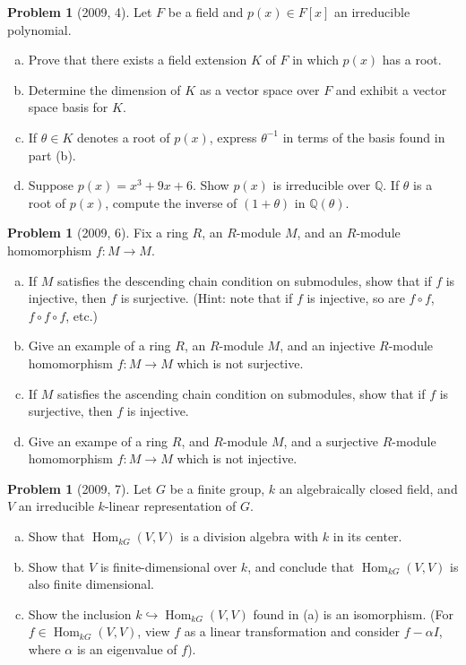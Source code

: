 \documentclass{article}
\newcommand{\inv}{^{-1}}
\newcommand{\<}{\langle} %
\renewcommand{\>}{\rangle} %
\DeclareMathOperator{\Hom}{Hom}
\theoremstyle{plain}
\theoremstyle{remark}
\theoremstyle{definition}
\newtheorem{examproblem}[equation]{Problem}
\begin{document}
\begin{examproblem}[2009, 4]
	Let $F$ be a field and $p(x)\in F[x]$ an irreducible polynomial.
	\begin{enumerate}[(a)]
		\item Prove that there exists a field extension $K$ of $F$
			in which $p(x)$ has a root.
		\item Determine the dimension of $K$ as a vector space over $F$
			and exhibit a vector space basis for $K$.
		\item If $\theta\in K$ denotes a root of $p(x)$, express
			$\theta\inv$ in terms of the basis found in part (b).
		\item Suppose $p(x)=x^3+9x+6$. Show $p(x)$ is irreducible over
			$\mathbb Q$. If $\theta$ is a root of $p(x)$, compute
			the inverse of $(1+\theta)$ in $\mathbb Q(\theta)$.
  \end{enumerate}
\end{examproblem}

\begin{examproblem}[2009, 6]
	Fix a ring $R$, an $R$-module $M$, and an $R$-module homomorphism
	$f:M\rightarrow M$.
	\begin{enumerate}[(a)]
		\item If $M$ satisfies the descending chain condition on submodules,
			show that if $f$ is injective, then $f$ is surjective.
			(Hint: note that if $f$ is injective, so are
			$f\circ f$, $f\circ f\circ f$, etc.)
		\item Give an example of a ring $R$, an $R$-module $M$,
			and an injective $R$-module homomorphism $f:M\rightarrow M$
			which is not surjective.
		\item If $M$ satisfies the ascending chain condition on submodules,
			show that if $f$ is surjective, then $f$ is injective.
		\item Give an exampe of a ring $R$, and $R$-module $M$, and
			a surjective $R$-module homomorphism $f:M\rightarrow M$
			which is not injective.
	\end{enumerate}
\end{examproblem}

\begin{examproblem}[2009, 7]
	Let $G$ be a finite group, $k$ an algebraically closed field, and $V$
	an irreducible $k$-linear representation of $G$.
	\begin{enumerate}[(a)]
		\item Show that $\Hom_{kG}(V,V)$ is a division algebra with $k$
			in its center.
		\item Show that $V$ is finite-dimensional over $k$, and conclude
			that $\Hom_{kG}(V,V)$ is also finite dimensional.
		\item Show the inclusion $k\hookrightarrow\Hom_{kG}(V,V)$ found
			in (a) is an isomorphism. (For $f\in\Hom_{kG}(V,V)$, view
			$f$ as a linear transformation and consider $f-\alpha I$,
			where $\alpha$ is an eigenvalue of $f$).
	\end{enumerate}
\end{examproblem}
\end{document}
